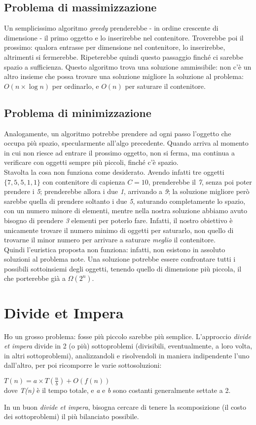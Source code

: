 \subsection{Problema di massimizzazione}
Un semplicissimo algoritmo \textit{greedy} prenderebbe - in ordine crescente di dimensione - il primo oggetto e lo inserirebbe nel contenitore. Troverebbe poi il prossimo: qualora entrasse per dimensione nel contenitore, lo inserirebbe, altrimenti si fermerebbe. Ripeterebbe quindi questo passaggio finché ci sarebbe spazio a sufficienza. Questo algoritmo trova una soluzione ammissibile: non c'è un altro insieme che possa trovare una soluzione migliore la soluzione al problema: $O(n\times \log{n})$ per ordinarlo, e $O(n)$ per saturare il contenitore.

\subsection{Problema di minimizzazione}
Analogamente, un algoritmo potrebbe prendere ad ogni passo l'oggetto che occupa più spazio, specularmente all'algo precedente. Quando arriva al momento in cui non riesce ad entrare il prossimo oggetto, non si ferma, ma continua a verificare con oggetti sempre più piccoli, finché c'è spazio. \\ Stavolta la cosa non funziona come desiderato. Avendo infatti tre oggetti $\{7, 5, 5, 1, 1\}$ con contenitore di capienza $C=10$, prenderebbe il \textit{7}, senza poi poter prendere i \textit{5}; prenderebbe allora i due \textit{1}, arrivando a \textit{9}; la soluzione migliore però sarebbe quella di prendere soltanto i due \textit{5}, saturando completamente lo spazio, con un numero minore di elementi, mentre nella nostra soluzione abbiamo avuto bisogno di prendere \textit{3} elementi per poterlo fare. Infatti, il nostro obiettivo è unicamente trovare il numero minimo di oggetti per saturarlo, non quello di trovarne il minor numero per arrivare a saturare \textit{meglio} il contenitore. \\
Quindi l'euristica proposta non funziona: infatti, non esistono in assoluto soluzioni al problema note.
Una soluzione potrebbe essere confrontare tutti i possibili sottoinsiemi degli oggetti, tenendo quello di dimensione più piccola, il che porterebbe già a $\Omega(2^n)$.
\newpage

\section{Divide et Impera}
Ho un grosso problema: fosse più piccolo sarebbe più semplice. L'approccio \textit{divide et impera} divide in 2 (o più) sottoproblemi (divisibili, eventualmente, a loro volta, in altri sottoproblemi), analizzandoli e risolvendoli in maniera indipendente l'uno dall'altro, per poi ricomporre le varie sottosoluzioni:
\begin{center}
	$T(n) = a\times T(\frac{n}{b}) + O(f(n))$ \\
	dove \textit{T(n)} è il tempo totale, e \textit{a} e \textit{b} sono costanti generalmente settate a 2.
\end{center}
In un buon \textit{divide et impera}, bisogna cercare di tenere la scomposizione (il costo dei sottoproblemi) il più bilanciato possibile.


